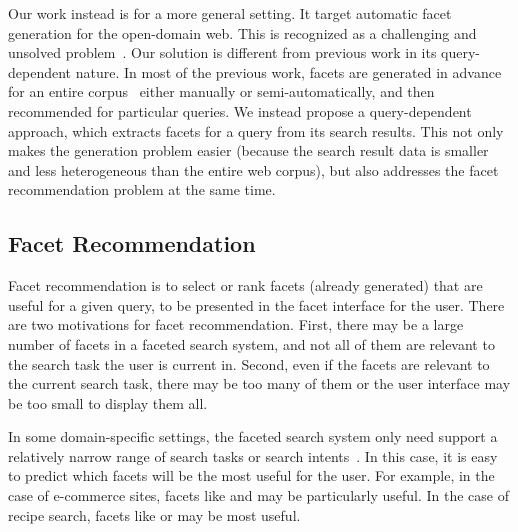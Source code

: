 Our work instead is for a more general setting. It target automatic facet generation for the open-domain web. This is recognized as a challenging and unsolved problem~\cite{tunkelang2009faceted,wei2013survey,teevan2008challenges}. Our solution is different from previous work in its query-dependent nature. In most of the previous work, facets are generated in advance for an entire corpus~\cite{stoica2007automating,dakka2008automatic} either manually or semi-automatically, and then recommended for particular queries. We instead propose a query-dependent approach, which extracts facets for a query from its search results.  This not only makes the generation problem easier (because the search result data is smaller and less heterogeneous than the entire web corpus), but also addresses the facet recommendation problem at the same time. 

\subsection{Facet Recommendation}
Facet recommendation is to select or rank facets (already generated) that are useful for a given query, to be presented in the facet interface for the user. There are two motivations for facet recommendation. First, there may be a large number of facets in a faceted search system, and not all of them are relevant to the search task the user is current in. Second, even if the facets are relevant to the current search task, there may be too many of them or the user interface may be too small to display them all. 

In some domain-specific settings, the faceted search system only need support a relatively narrow range of search tasks or search intents~\cite{teevan2008challenges}. In this case, it is easy to predict which facets will be the most useful for the user. For example, in the case of e-commerce sites, facets like  and  may be particularly useful. In the case of recipe search, facets like  or  may be most useful. 


